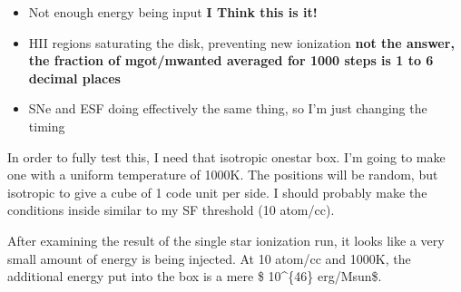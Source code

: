 \documentclass[11pt,letterpaper]{article}
\begin{document}
\begin{itemize}
\item
  Not enough energy being input \textbf{I Think this is it!}
\item
  HII regions saturating the disk, preventing new ionization \textbf{not
  the answer, the fraction of mgot/mwanted averaged for 1000 steps is 1
  to 6 decimal places}
\item
  SNe and ESF doing effectively the same thing, so I'm just changing the
  timing
\end{itemize}

In order to fully test this, I need that isotropic onestar box. I'm
going to make one with a uniform temperature of 1000K. The positions
will be random, but isotropic to give a cube of 1 code unit per side. I
should probably make the conditions inside similar to my SF threshold
(10 atom/cc).

After examining the result of the single star ionization run, it looks
like a very small amount of energy is being injected. At 10 atom/cc and
1000K, the additional energy put into the box is a mere \$ 10\^{}\{46\}
erg/Msun\$.
\end{document}

